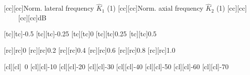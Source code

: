 [cc][cc]{\footnotesize Norm. lateral frequency $\hat{K}_{1}$ (1)}
[cc][cc]{\footnotesize Norm. axial frequency $\hat{K}_{2}$ (1)}
[cc][cc]{\footnotesize \textcolor{white}{$0.05$}}
[cc][cc]{\footnotesize \si{\deci\bel}}

[tc][tc]{\scriptsize -0.5}
[tc][tc]{\scriptsize -0.25}
[tc][tc]{\scriptsize 0}
[tc][tc]{\scriptsize 0.25}
[tc][tc]{\scriptsize 0.5}

[rc][rc]{\scriptsize 0}
[rc][rc]{\scriptsize 0.2}
[rc][rc]{\scriptsize 0.4}
[rc][rc]{\scriptsize 0.6}
[rc][rc]{\scriptsize 0.8}
[rc][rc]{\scriptsize 1.0}

[cl][cl]{\scriptsize ~0}
[cl][cl]{\scriptsize -10}
[cl][cl]{\scriptsize -20}
[cl][cl]{\scriptsize -30}
[cl][cl]{\scriptsize -40}
[cl][cl]{\scriptsize -50}
[cl][cl]{\scriptsize -60}
[cl][cl]{\scriptsize -70}


